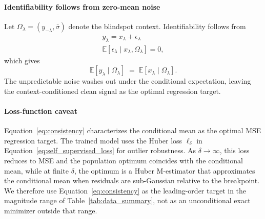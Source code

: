 \documentclass[twocolumn]{aastex7}
\begin{document}
\paragraph{Identifiability follows from zero-mean noise} Let $\Omega_{\lambda} = (y_{-\lambda},\bar{\sigma})$ denote the blindspot context. Identifiability follows from
\begin{align}
    y_{\lambda} = x_{\lambda} + \epsilon_{\lambda} \\[1em]
    \mathbb{E}\!\left[\epsilon_{\lambda} \mid x_{\lambda},\Omega_{\lambda}\right] = 0,
    \label{eq:consistency_setup}
\end{align}
which gives
\begin{equation}
    \mathbb{E}\!\left[y_{\lambda}\mid \Omega_{\lambda}\right]
    \;=\;
    \mathbb{E}\!\left[x_{\lambda}\mid \Omega_{\lambda}\right].
    \label{eq:consistency}
\end{equation}
The unpredictable noise washes out under the conditional expectation, leaving the context-conditioned clean signal as the optimal regression target.

\paragraph{Loss-function caveat}
Equation~\ref{eq:consistency} characterizes the conditional mean as the optimal MSE regression target. The trained model uses the Huber loss $\ell_{\delta}$ in Equation~\ref{eq:self_supervised_loss} for outlier robustness. As $\delta\to\infty$, this loss reduces to MSE and the population optimum coincides with the conditional mean, while at finite $\delta$, the optimum is a Huber M-estimator that approximates the conditional mean when residuals are sub-Gaussian relative to the breakpoint. We therefore use Equation~\ref{eq:consistency} as the leading-order target in the magnitude range of Table~\ref{tab:data_summary}, not as an unconditional exact minimizer outside that range.
\end{document}

